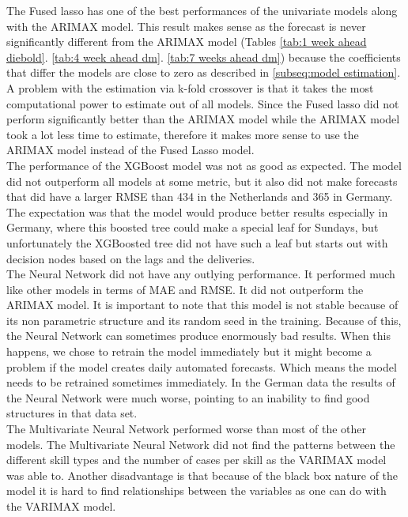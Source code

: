 The Fused lasso has one of the best performances of the univariate models along with the ARIMAX model. This result makes sense as the forecast is never significantly different from the ARIMAX model (Tables \ref{tab:1 week ahead diebold}. \ref{tab:4 week ahead dm}. \ref{tab:7 weeks ahead dm}) because the coefficients that differ the models are close to zero as described in \autoref{subseq:model estimation}. A problem with the estimation via k-fold crossover is that it takes the most computational power to estimate out of all models. Since the Fused lasso did not perform significantly better than the ARIMAX model while the ARIMAX model took a lot less time to estimate, therefore it makes more sense to use the ARIMAX model instead of the Fused Lasso model.\\

The performance of the XGBoost model was not as good as expected. The model did not outperform all models at some metric, but it also did not make forecasts that did have a larger RMSE than 434 in the Netherlands and 365 in Germany. The expectation was that the model would produce better results especially in Germany, where this boosted tree could make a special leaf for Sundays, but unfortunately the XGBoosted tree did not have such a leaf but starts out with decision nodes based on the lags and the deliveries. \\

The Neural Network did not have any outlying performance. It performed much like other models in terms of MAE and RMSE. It did not outperform the ARIMAX  model. It is important to note that this model is not stable because of its non parametric structure and its random seed in the training. Because of this, the Neural Network can sometimes produce enormously bad results. When this happens, we chose to retrain the model immediately but it might become a problem if the model creates daily automated forecasts. Which means the model needs to be retrained sometimes immediately. In the German data the results of the Neural Network were much worse, pointing to an inability to find good structures in that data set.\\

The Multivariate Neural Network performed worse than most of the other models. The Multivariate Neural Network did not find the patterns between the different skill types and the number of cases per skill as the VARIMAX model was able to. Another disadvantage is that because of the black box nature of the model it is hard to find relationships between the variables as one can do with the VARIMAX model.\\

